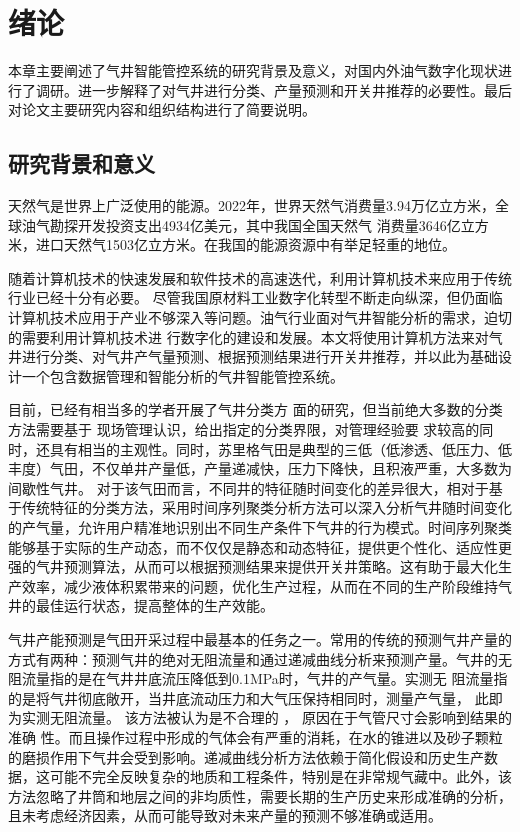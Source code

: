 \chapter{绪论}
本章主要阐述了气井智能管控系统的研究背景及意义，对国内外油气数字化现状进行了调研。进一步解释了对气井进行分类、产量预测和开关井推荐的必要性。最后对论文主要研究内容和组织结构进行了简要说明。
\section{研究背景和意义}
天然气是世界上广泛使用的能源。2022年，世界天然气消费量3.94万亿立方米，全球油气勘探开发投资支出4934亿美元，其中我国全国天然气
消费量3646亿立方米，进口天然气1503亿立方米\cite{chinaGasGOv}。在我国的能源资源中有举足轻重的地位。

随着计算机技术的快速发展和软件技术的高速迭代，利用计算机技术来应用于传统行业已经十分有必要。
尽管我国原材料工业数字化转型不断走向纵深，但仍面临计算机技术应用于产业不够深入等问题\cite{workplanForPetrochemical}。油气行业面对气井智能分析的需求，迫切的需要利用计算机技术进
行数字化的建设和发展。本文将使用计算机方法来对气井进行分类、对气井产气量预测、根据预测结果进行开关井推荐，并以此为基础设计一个包含数据管理和智能分析的气井智能管控系统。

目前，已经有相当多的学者开展了气井分类方
面的研究，但当前绝大多数的分类方法需要基于
现场管理认识，给出指定的分类界限，对管理经验要
求较高的同时，还具有相当的主观性\cite{SYZC202104015}。同时，苏里格气田是典型的三低（低渗透、低压力、低丰度）气田，不仅单井产量低，产量递减快，压力下降快，且积液严重，大多数为间歇性气井\cite{KTSY202306014}。
对于该气田而言，不同井的特征随时间变化的差异很大，相对于基于传统特征的分类方法，采用时间序列聚类分析方法可以深入分析气井随时间变化的产气量，允许用户精准地识别出不同生产条件下气井的行为模式。时间序列聚类能够基于实际的生产动态，而不仅仅是静态和动态特征，提供更个性化、适应性更强的气井预测算法，从而可以根据预测结果来提供开关井策略。这有助于最大化生产效率，减少液体积累带来的问题，优化生产过程，从而在不同的生产阶段维持气井的最佳运行状态，提高整体的生产效能。

气井产能预测是气田开采过程中最基本的任务之一。常用的传统的预测气井产量的方式有两种：预测气井的绝对无阻流量和通过递减曲线分析来预测产量。气井的无阻流量指的是在气井井底流压降低到0.1MPa时，气井的产气量。实测无
阻流量指的是将气井彻底敞开，当井底流动压力和大气压保持相同时，测量产气量， 此即为实测无阻流量。 该方法被认为是不合理的 ， 原因在于气管尺寸会影响到结果的准确
性。而且操作过程中形成的气体会有严重的消耗，在水的锥进以及砂子颗粒的磨损作用下气井会受到影响。递减曲线分析方法依赖于简化假设和历史生产数据，这可能不完全反映复杂的地质和工程条件，特别是在非常规气藏中。此外，该方法忽略了井筒和地层之间的非均质性，需要长期的生产历史来形成准确的分析，且未考虑经济因素，从而可能导致对未来产量的预测不够准确或适用。

